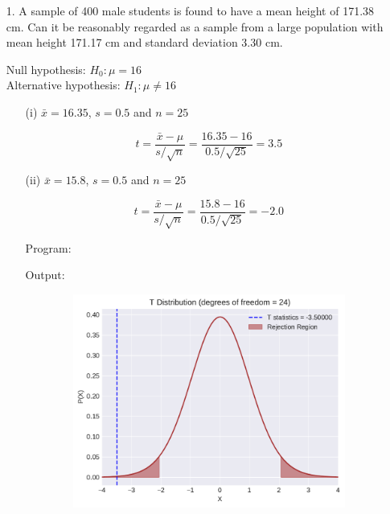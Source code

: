\documentclass[a4paper,10pt,openright]{report}
\begin{document}
\begin{enumerate}

\item[1.] A sample of 400 male students is found to have a mean height of 171.38 cm. Can it
be reasonably regarded as a sample from a large population with mean height 171.17 cm and
standard deviation 3.30 cm.

Null hypothesis: $H_{0}: \mu = 16$ \\
Alternative hypothesis: $H_{1}: \mu \neq 16$ 

\begin{enumerate}
\item[(i)] $\bar x = 16.35$, $s = 0.5$ and $n = 25$ 

\begin{equation*}
t = \frac{\bar x - \mu}{s/\sqrt{n}}
  = \frac{16.35 - 16}{0.5/\sqrt{25}} 
  = 3.5
\end{equation*}

\item[(ii)] $\bar x = 15.8$, $s = 0.5$ and $n = 25$

\begin{equation*}
t = \frac{\bar x - \mu}{s/\sqrt{n}}
  = \frac{15.8 - 16}{0.5/\sqrt{25}}
  = -2.0
\end{equation*}	

\vspace{0.5cm}

Program:


Output:


\begin{figure}[ht!]
\includegraphics[width=14cm,height=7cm,keepaspectratio]{tscript1a.pdf}
\centering
\end{figure}

\pagebreak


\end{enumerate}
\end{enumerate}
\end{document}

